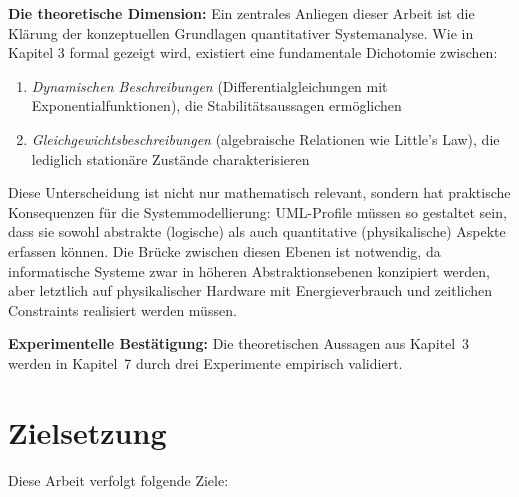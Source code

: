 ﻿\documentclass[a4paper,12pt]{report}
\theoremstyle{definition}
\begin{document}
\textbf{Die theoretische Dimension:} Ein zentrales Anliegen dieser Arbeit ist die Klärung der konzeptuellen Grundlagen quantitativer Systemanalyse. Wie in Kapitel 3 formal gezeigt wird, existiert eine fundamentale Dichotomie zwischen:

\begin{enumerate}
	\item[-] \textit{Dynamischen Beschreibungen} (Differentialgleichungen mit Exponentialfunktionen), die Stabilitätsaussagen ermöglichen
	\item[-] \textit{Gleichgewichtsbeschreibungen} (algebraische Relationen wie Little's Law), die lediglich stationäre Zustände charakterisieren
\end{enumerate}

Diese Unterscheidung ist nicht nur mathematisch relevant, sondern hat praktische Konsequenzen für die Systemmodellierung: UML-Profile müssen so gestaltet sein, dass sie sowohl abstrakte (logische) als auch quantitative (physikalische) Aspekte erfassen können. Die Brücke zwischen diesen Ebenen ist notwendig, da informatische Systeme zwar in höheren Abstraktionsebenen konzipiert werden, aber letztlich auf physikalischer Hardware mit Energieverbrauch und zeitlichen Constraints realisiert werden müssen.

\textbf{Experimentelle Bestätigung:} Die theoretischen Aussagen aus
Kapitel~3 werden in Kapitel~7 durch drei Experimente empirisch validiert.

\section{Zielsetzung}

Diese Arbeit verfolgt folgende Ziele:
\end{document}
